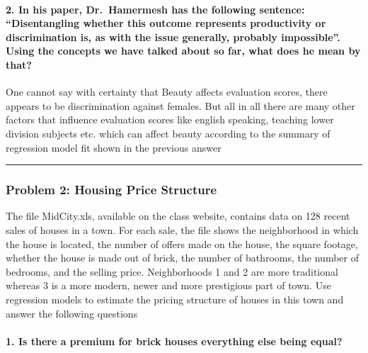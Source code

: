\documentclass[
]{article}
\begin{document}
\hypertarget{in-his-paper-dr.-hamermesh-has-the-following-sentence-disentangling-whether-this-outcome-represents-productivity-or-discrimination-is-as-with-the-issue-generally-probably-impossible.-using-the-concepts-we-have-talked-about-so-far-what-does-he-mean-by-that}{%
\paragraph{2. In his paper, Dr.~Hamermesh has the following sentence:
``Disentangling whether this outcome represents productivity or
discrimination is, as with the issue generally, probably impossible''.
Using the concepts we have talked about so far, what does he mean by
that?}\label{in-his-paper-dr.-hamermesh-has-the-following-sentence-disentangling-whether-this-outcome-represents-productivity-or-discrimination-is-as-with-the-issue-generally-probably-impossible.-using-the-concepts-we-have-talked-about-so-far-what-does-he-mean-by-that}}

One cannot say with certainty that Beauty affects evaluation scores,
there appears to be discrimination against females. But all in all there
are many other factors that influence evaluation scores like english
speaking, teaching lower division subjects etc. which can affect beauty
according to the summary of regression model fit shown in the previous
answer

\begin{center}\rule{0.5\linewidth}{0.5pt}\end{center}

\hypertarget{problem-2-housing-price-structure}{%
\subsubsection{Problem 2: Housing Price
Structure}\label{problem-2-housing-price-structure}}

The file MidCity.xls, available on the class website, contains data on
128 recent sales of houses in a town. For each sale, the file shows the
neighborhood in which the house is located, the number of offers made on
the house, the square footage, whether the house is made out of brick,
the number of bathrooms, the number of bedrooms, and the selling price.
Neighborhoods 1 and 2 are more traditional whereas 3 is a more modern,
newer and more prestigious part of town. Use regression models to
estimate the pricing structure of houses in this town and answer the
following questions

\hypertarget{is-there-a-premium-for-brick-houses-everything-else-being-equal}{%
\paragraph{1. Is there a premium for brick houses everything else being
equal?}\label{is-there-a-premium-for-brick-houses-everything-else-being-equal}}
\end{document}
